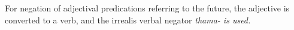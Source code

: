 For negation of adjectival predications referring to the future, the adjective is converted to a verb, and the irrealis verbal negator \em thama- \em is used.




% 



% 


% 




% 

